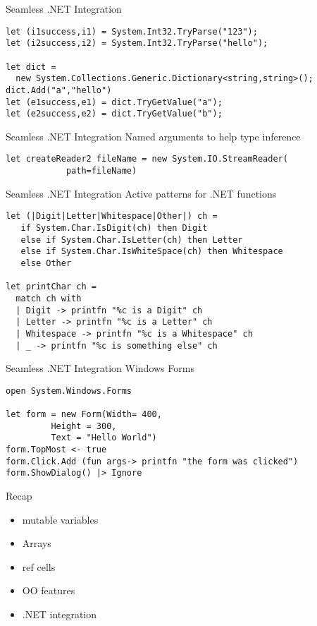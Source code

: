\documentclass{beamer}
\begin{document}
\begin{frame}[fragile]{Seamless .NET Integration}
  \small
  \begin{verbatim}
let (i1success,i1) = System.Int32.TryParse("123");
let (i2success,i2) = System.Int32.TryParse("hello");

let dict =
  new System.Collections.Generic.Dictionary<string,string>();
dict.Add("a","hello")
let (e1success,e1) = dict.TryGetValue("a");
let (e2success,e2) = dict.TryGetValue("b");
  \end{verbatim}
\end{frame}

\begin{frame}[fragile]{Seamless .NET Integration}
  Named arguments to help type inference
  \begin{verbatim}
let createReader2 fileName = new System.IO.StreamReader(
            path=fileName)
  \end{verbatim}
\end{frame}

\begin{frame}[fragile]{Seamless .NET Integration}
  Active patterns for .NET functions
  \begin{verbatim}
let (|Digit|Letter|Whitespace|Other|) ch = 
   if System.Char.IsDigit(ch) then Digit
   else if System.Char.IsLetter(ch) then Letter
   else if System.Char.IsWhiteSpace(ch) then Whitespace
   else Other

let printChar ch = 
  match ch with
  | Digit -> printfn "%c is a Digit" ch
  | Letter -> printfn "%c is a Letter" ch
  | Whitespace -> printfn "%c is a Whitespace" ch
  | _ -> printfn "%c is something else" ch
  \end{verbatim}
\end{frame}

\begin{frame}[fragile]{Seamless .NET Integration}
  Windows Forms
  \begin{verbatim}
open System.Windows.Forms 

let form = new Form(Width= 400,
         Height = 300,
         Text = "Hello World") 
form.TopMost <- true
form.Click.Add (fun args-> printfn "the form was clicked")
form.ShowDialog() |> Ignore
  \end{verbatim}
\end{frame}

\begin{frame}{Recap}
  \begin{itemize}[<+->]
    \item mutable variables
    \item Arrays
    \item ref cells
    \item OO features
    \item .NET integration
  \end{itemize}
\end{frame}
\end{document}
